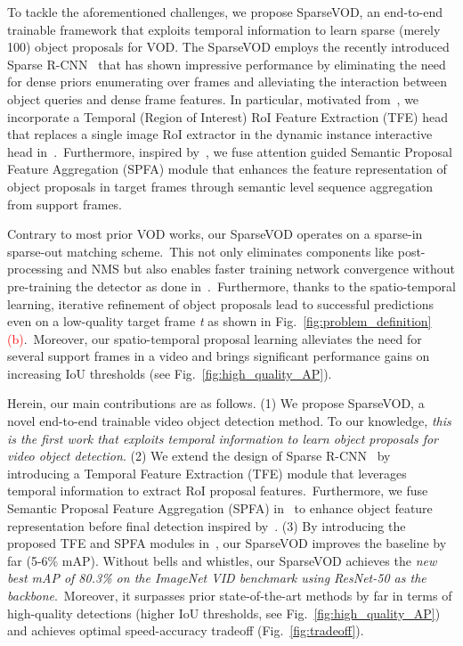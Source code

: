 \documentclass{bmvc2k}
\begin{document}
To tackle the aforementioned challenges, we propose SparseVOD, an end-to-end trainable framework that exploits temporal information to learn sparse (merely 100) object proposals for VOD. 
The SparseVOD employs the recently introduced Sparse R-CNN~\cite{sun2021sparse} that has shown impressive performance by eliminating the need for dense priors enumerating over frames and alleviating the interaction between object queries and dense frame features. In particular, motivated from~\cite{wu2019sequence, gong2021temporal}, we incorporate a Temporal (Region of Interest) RoI Feature Extraction (TFE) head that replaces a single image RoI extractor in the dynamic instance interactive head in~\cite{sun2021sparse}.~Furthermore, inspired by~\cite{wu2019sequence}, we fuse attention guided Semantic Proposal Feature Aggregation (SPFA) module that enhances the feature representation of object proposals in target frames through semantic level sequence aggregation from support frames.

Contrary to most prior VOD works, our SparseVOD operates on a sparse-in sparse-out matching scheme.~This not only eliminates components like post-processing and NMS but also enables faster training network convergence without pre-training the detector as done in~\cite{he2021end}.~Furthermore, thanks to the spatio-temporal learning, iterative refinement of object proposals lead to successful predictions even on a low-quality target frame \textit{t} as shown in Fig.~\ref{fig:problem_definition}\textcolor{red}{(b)}.~Moreover, our spatio-temporal proposal learning alleviates the need for several support frames in a video and brings significant performance gains on increasing IoU thresholds (see Fig.~\ref{fig:high_quality_AP}).

Herein, our main contributions are as follows.
(1) We propose SparseVOD, a novel end-to-end trainable video object detection method. To our knowledge, \textit{this is the first work that exploits temporal information to learn object proposals for video object detection}. (2) We extend the design of Sparse R-CNN~\cite{sun2021sparse} by introducing a Temporal Feature Extraction (TFE) module that leverages temporal information to extract RoI proposal features.~Furthermore, we fuse Semantic Proposal Feature Aggregation (SPFA) in~\cite{sun2021sparse} to enhance object feature representation before final detection inspired by~\cite{wu2019sequence, gong2021temporal}.
(3) By introducing the proposed TFE and SPFA modules in~\cite{sun2021sparse}, our SparseVOD improves the baseline by far (5-6\% mAP). Without bells and whistles, our SparseVOD achieves the \textit{new best mAP of 80.3\% on the ImageNet VID benchmark using ResNet-50 as the backbone}.~Moreover, it surpasses prior state-of-the-art methods by far in terms of high-quality detections (higher IoU thresholds, see Fig.~\ref{fig:high_quality_AP}) and achieves optimal speed-accuracy tradeoff (Fig.~\ref{fig:tradeoff}).
\end{document}
